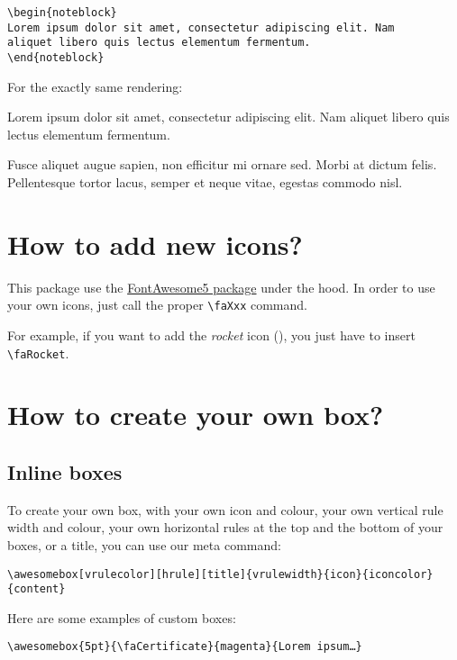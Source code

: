 \documentclass[a4paper,12pt]{article}
\newcommand\hrefcolor[2]{\textcolor{magenta}{\href{#1}{#2}}}
\begin{document}
\begin{verbatim}
\begin{noteblock}
Lorem ipsum dolor sit amet, consectetur adipiscing elit. Nam
aliquet libero quis lectus elementum fermentum.
\end{noteblock}
\end{verbatim}

For the exactly same rendering:

\begin{noteblock}
  Lorem ipsum dolor sit amet, consectetur adipiscing elit. Nam aliquet
  libero quis lectus elementum fermentum.

  Fusce aliquet augue sapien, non efficitur mi ornare sed. Morbi at
  dictum felis. Pellentesque tortor lacus, semper et neque vitae,
  egestas commodo nisl.
\end{noteblock}

\section{How to add new icons?}
\label{sec:new-icons}

This package use the
\hrefcolor{https://www.ctan.org/pkg/fontawesome5}{FontAwesome5 package}
under the hood. In order to use your own icons, just call the proper
\verb!\faXxx! command.

For example, if you want to add the \emph{rocket} icon
(\faRocket), you just have to  insert \verb!\faRocket!.

\section{How to create your own box?}
\label{sec:howtoown}
\subsection{Inline boxes}

To create your own box, with your own icon and colour, your own
vertical rule width and colour, your own horizontal rules at the top
and the bottom of your boxes, or a title, you can use our meta
command:

\begin{center}
\verb!\awesomebox[vrulecolor][hrule][title]{vrulewidth}{icon}{iconcolor}{content}!
\end{center}

Here are some examples of custom boxes:

\begin{center}
\verb!\awesomebox{5pt}{\faCertificate}{magenta}{Lorem ipsum…}!
\end{center}
\end{document}
